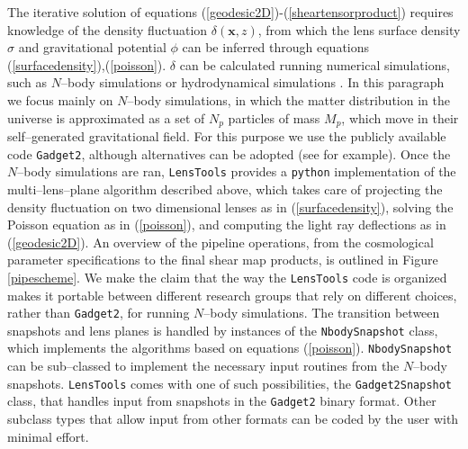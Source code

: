 \documentclass[5p]{elsarticle}
\newcommand{\bb}[1]{\mathbf{#1}}
\newcommand{\ttt}[1]{\texttt{#1}}
\newcommand{\LT}{\texttt{LensTools} }
\begin{document}
The iterative solution of equations (\ref{geodesic2D})-(\ref{sheartensorproduct}) requires knowledge of the density fluctuation $\delta(\bb{x},z)$, from which the lens surface density $\sigma$ and gravitational potential $\phi$ can be inferred through equations (\ref{surfacedensity}),(\ref{poisson}). $\delta$ can be calculated running numerical simulations, such as $N$--body simulations \citep{Gadget2,HACC} or hydrodynamical simulations \citep{Flash}. In this paragraph we focus mainly on $N$--body simulations, in which the matter distribution in the universe is approximated as a set of $N_p$ particles of mass $M_p$, which move in their self--generated gravitational field. For this purpose we use the publicly available code \ttt{Gadget2}\citep{Gadget2}, although alternatives can be adopted (see \citep{HACC} for example). Once the $N$--body simulations are ran, \LT provides a \ttt{python} implementation of the multi--lens--plane algorithm \citep{RayTracingHartlap} described above, which takes care of projecting the density fluctuation on two dimensional lenses as in (\ref{surfacedensity}), solving the Poisson equation as in (\ref{poisson}), and computing the light ray deflections as in (\ref{geodesic2D}). An overview of the pipeline operations, from the cosmological parameter specifications to the final shear map products, is outlined in Figure \ref{pipescheme}. We make the claim that the way the \LT code is organized makes it portable between different research groups that rely on different choices, rather than \ttt{Gadget2}, for running $N$--body simulations. The transition between snapshots and lens planes is handled by instances of the \ttt{NbodySnapshot} class, which implements the algorithms based on equations (\ref{poisson}). \ttt{NbodySnapshot} can be sub--classed to implement the necessary input routines from the $N$--body snapshots. \LT comes with one of such possibilities, the \ttt{Gadget2Snapshot} class, that handles input from snapshots in the \ttt{Gadget2} binary format. Other subclass types that allow input from other formats can be coded by the user with minimal effort.  
\end{document}
